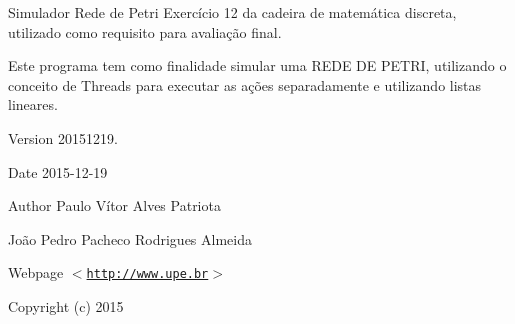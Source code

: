 Simulador Rede de Petri Exercício 12 da cadeira de matemática discreta, utilizado como requisito para avaliação final.

Este programa tem como finalidade simular uma R\+E\+D\+E D\+E P\+E\+T\+R\+I, utilizando o conceito de Threads para executar as ações separadamente e utilizando listas lineares.

\begin{DoxyVersion}{Version}
20151219. 
\end{DoxyVersion}
\begin{DoxyDate}{Date}
2015-\/12-\/19
\end{DoxyDate}
\begin{DoxyAuthor}{Author}
Paulo Vítor Alves Patriota 

João Pedro Pacheco Rodrigues Almeida
\end{DoxyAuthor}
\begin{DoxyParagraph}{Webpage}
$<$\href{http://www.upe.br}{\tt http\+://www.\+upe.\+br}$>$
\end{DoxyParagraph}
\begin{DoxyCopyright}{Copyright}
(c) 2015 
\end{DoxyCopyright}
